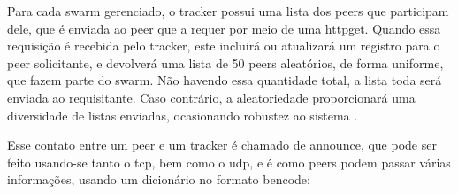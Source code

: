 Para cada \gls*{swarm} gerenciado, o \gls*{tracker} possui uma lista dos \glspl*{peer}
que participam dele, que é enviada ao \gls*{peer} que a requer por meio de uma
\gls{httpget}. Quando essa requisição é recebida pelo \gls*{tracker}, este incluirá ou
atualizará um registro para o \gls*{peer} solicitante, e devolverá uma lista de 50
\glspl*{peer} aleatórios, de forma uniforme, que fazem parte do \gls*{swarm}. Não
havendo essa quantidade total, a lista toda será enviada ao requisitante. Caso
contrário, a aleatoriedade proporcionará uma diversidade de listas enviadas,
ocasionando robustez ao sistema \cite{wikitheory:tracker-response}.

Esse contato entre um \gls*{peer} e um \gls*{tracker} é chamado de \gls{announce}, que
pode ser feito usando-se tanto o \gls{tcp}, bem como o \gls{udp}, e é como \glspl*{peer}
podem passar várias informações, usando um dicionário no formato \gls*{bencode}:

